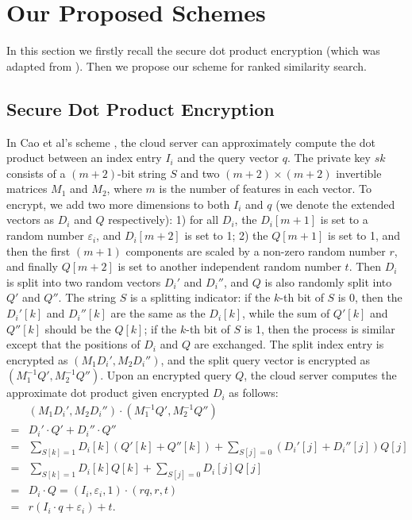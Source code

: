 \documentclass{IEEEtran}
\begin{document}
\section{Our Proposed Schemes}
In this section we firstly recall the secure dot product encryption \cite{Cao14} (which was adapted from \cite{Wong09}). Then we propose our scheme for ranked similarity search.

\subsection{Secure Dot Product Encryption}
In Cao et al's scheme \cite{Cao14}, the cloud server can approximately compute the dot product between an index entry $I_i$ and the query vector $q$. The private key $sk$ consists of a $(m+2)$-bit string $S$ and two $(m+2)\times (m+2)$ invertible matrices $M_1$ and $M_2$, where $m$ is the number of features in each vector. To encrypt, we add two more dimensions to both $I_i$ and $q$ (we denote the extended vectors as $D_i$ and $Q$ respectively): 1) for all $D_i$, the $D_i[m+1]$ is set to a random number $\varepsilon_i$, and $D_i[m+2]$ is set to 1; 2) the $Q[m+1]$ is set to 1, and then the first $(m+1)$ components are scaled by a non-zero random number $r$, and finally $Q[m+2]$ is set to another independent random number $t$. Then $D_i$ is split into two random vectors $D_i'$ and $D_i''$, and $Q$ is also randomly split into $Q'$ and $Q''$. The string $S$ is a splitting indicator: if the $k$-th bit of $S$ is 0, then the $D_i'[k]$ and $D_i''[k]$ are the same as the $D_i[k]$, while the sum of $Q'[k]$ and $Q''[k]$ should be the $Q[k]$; if the $k$-th bit of $S$ is 1, then the process is similar except that the positions of $D_i$ and $Q$ are exchanged. The split index entry is encrypted as $(M_1D_i', M_2D_i'')$, and the split query vector is encrypted as $(M_1^{-1}Q', M_2^{-1}Q'')$. Upon an encrypted query $Q$, the cloud server computes the approximate dot product given encrypted $D_i$ as follows:
\begin{equation*}
\begin{aligned}
&(M_1D_i', M_2D_i'')\cdot(M_1^{-1}Q', M_2^{-1}Q'') \\
=&D_i'\cdot Q' + D_i''\cdot Q''\\
=&\sum_{S[k]=1}D_i[k](Q'[k] + Q''[k]) + \sum_{S[j]=0} (D_i'[j]+ D_i''[j])Q[j]\\
=&\sum_{S[k]=1}D_i[k]Q[k] + \sum_{S[j]=0} D_i[j]Q[j]\\
=&D_i \cdot Q = (I_i,\varepsilon_i,1)\cdot (rq,r,t)\\
=&r(I_i\cdot q+\varepsilon_i)+t.
\end{aligned}
\end{equation*}
\end{document}
